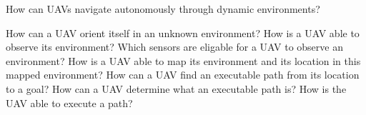 How can UAVs navigate autonomously through dynamic environments?

\begin{outline}
  \1 How can a UAV orient itself in an unknown environment?
    \2 How is a UAV able to observe its environment?
      \3 Which sensors are eligable for a UAV to observe an environment?
    \2 How is a UAV able to map its environment and its location in this mapped environment?
  \1 How can a UAV find an executable path from its location to a goal?
    \2 How can a UAV determine what an executable path is?
  \1 How is the UAV able to execute a path?
\end{outline}